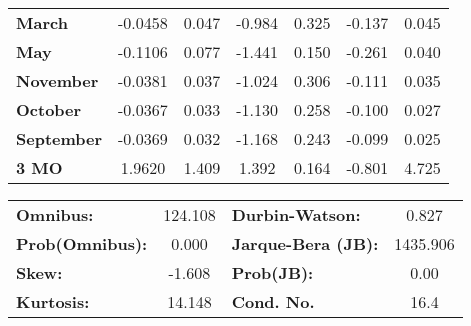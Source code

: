 \begin{center}
\begin{tabular}{lcccccc}
\textbf{March}     &      -0.0458  &        0.047     &    -0.984  &         0.325        &       -0.137    &        0.045     \\
\textbf{May}       &      -0.1106  &        0.077     &    -1.441  &         0.150        &       -0.261    &        0.040     \\
\textbf{November}  &      -0.0381  &        0.037     &    -1.024  &         0.306        &       -0.111    &        0.035     \\
\textbf{October}   &      -0.0367  &        0.033     &    -1.130  &         0.258        &       -0.100    &        0.027     \\
\textbf{September} &      -0.0369  &        0.032     &    -1.168  &         0.243        &       -0.099    &        0.025     \\
\textbf{3 MO}      &       1.9620  &        1.409     &     1.392  &         0.164        &       -0.801    &        4.725     \\
\bottomrule
\end{tabular}
\begin{tabular}{lclc}
\textbf{Omnibus:}       & 124.108 & \textbf{  Durbin-Watson:     } &    0.827  \\
\textbf{Prob(Omnibus):} &   0.000 & \textbf{  Jarque-Bera (JB):  } & 1435.906  \\
\textbf{Skew:}          &  -1.608 & \textbf{  Prob(JB):          } &     0.00  \\
\textbf{Kurtosis:}      &  14.148 & \textbf{  Cond. No.          } &     16.4  \\
\bottomrule
\end{tabular}
\end{center}

